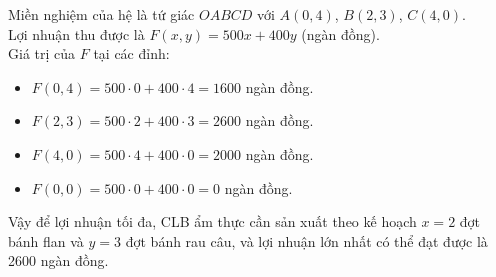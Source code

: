 \begin{bt}
{\begin{center}
\begin{tikzpicture}[>=stealth', x=1cm, y=1cm, scale=1]
			\end{tikzpicture}
		\end{center}
		Miền nghiệm của hệ là tứ giác $OABCD$ với $A(0, 4)$, $B(2, 3)$, $C(4, 0)$.\\
		Lợi nhuận thu được là $F(x, y) = 500x + 400y$ (ngàn đồng).\\
		Giá trị của $F$ tại các đỉnh:
		\begin{itemize}
			\item \( F(0, 4) = 500 \cdot 0 + 400 \cdot 4 = 1600 \) ngàn đồng.
			\item \( F(2, 3) = 500 \cdot 2 + 400 \cdot 3 = 2600 \) ngàn đồng.
			\item \( F(4, 0) = 500 \cdot 4 + 400 \cdot 0 = 2000 \) ngàn đồng.
			\item \( F(0, 0) = 500 \cdot 0 + 400 \cdot 0 = 0 \) ngàn đồng.
		\end{itemize}
		Vậy để lợi nhuận tối đa, CLB ẩm thực cần sản xuất theo kế hoạch \( x = 2 \) đợt bánh flan và \( y = 3 \) đợt bánh rau câu, và lợi nhuận lớn nhất có thể đạt được là 2600 ngàn đồng.
	}
\end{bt}

